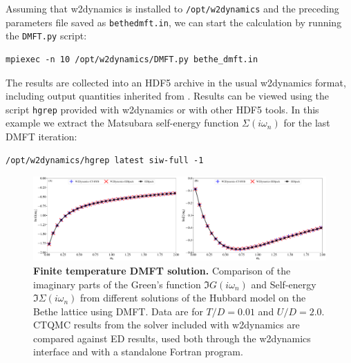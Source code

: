 \documentclass[edipack_sp.tex]{subfiles}
\begin{document}
Assuming that w2dynamics is installed to {\tt /opt/w2dynamics} and the preceding parameters file saved as {\tt bethe\textunderscore{}dmft.in}, we can start the calculation by running the {\tt DMFT.py} script:
\begin{lstlisting}[style=mybash,numbers=none]
mpiexec -n 10 /opt/w2dynamics/DMFT.py bethe_dmft.in
\end{lstlisting}

The results are collected into an HDF5 archive in the usual w2dynamics format, including output quantities inherited from \NAME. Results can be viewed using the script {\tt hgrep} provided with w2dynamics or with other HDF5 tools. In this example we extract the Matsubara self-energy function $\Sigma(i\omega_n)$ for the last DMFT iteration:
\begin{lstlisting}[style=mybash,numbers=none]
/opt/w2dynamics/hgrep latest siw-full -1
\end{lstlisting}

\begin{figure}%
  \includegraphics[width=\linewidth]{figures/figBetheW2D.pdf}
    \caption{\label{figEx1W}%
    \textbf{Finite temperature DMFT solution.}
    Comparison of the imaginary parts of the Green's function $\Im{G}(i\omega_n)$ and Self-energy $\Im{\Sigma}(i\omega_n)$ from different solutions of the Hubbard model on the Bethe lattice using DMFT. Data are for $T/D=0.01$ and $U/D=2.0$. CTQMC results from the solver included with w2dynamics are compared against \NAME ED results, used both through the w2dynamics interface and with a standalone Fortran program. 
        }
\end{figure}
\end{document}
